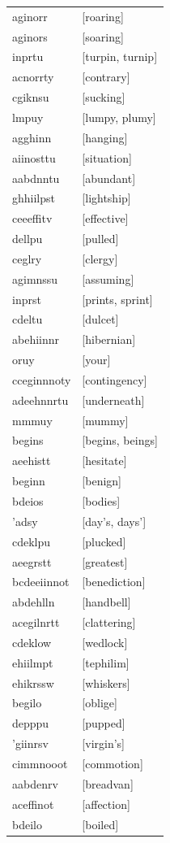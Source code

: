 \documentclass{article}
\begin{document}
\begin{tabular}{ll}
aginorr & [roaring] \\
aginors & [soaring] \\
inprtu & [turpin, turnip] \\
acnorrty & [contrary] \\
cgiknsu & [sucking] \\
lmpuy & [lumpy, plumy] \\
agghinn & [hanging] \\
aiinosttu & [situation] \\
aabdnntu & [abundant] \\
ghhiilpst & [lightship] \\
ceeeffitv & [effective] \\
dellpu & [pulled] \\
ceglry & [clergy] \\
agimnssu & [assuming] \\
inprst & [prints, sprint] \\
cdeltu & [dulcet] \\
abehiinnr & [hibernian] \\
oruy & [your] \\
cceginnnoty & [contingency] \\
adeehnnrtu & [underneath] \\
mmmuy & [mummy] \\
begins & [begins, beings] \\
aeehistt & [hesitate] \\
beginn & [benign] \\
bdeios & [bodies] \\
'adsy & [day's, days'] \\
cdeklpu & [plucked] \\
aeegrstt & [greatest] \\
bcdeeiinnot & [benediction] \\
abdehlln & [handbell] \\
acegilnrtt & [clattering] \\
cdeklow & [wedlock] \\
ehiilmpt & [tephilim] \\
ehikrssw & [whiskers] \\
begilo & [oblige] \\
depppu & [pupped] \\
'giinrsv & [virgin's] \\
cimmnooot & [commotion] \\
aabdenrv & [breadvan] \\
aceffinot & [affection] \\
bdeilo & [boiled] \\

\end{tabular}
\end{document}
